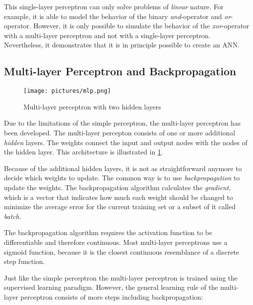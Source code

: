 This single-layer perceptron can only solve problems of \textit{linear} nature. For example, it is able to model the behavior of the binary \textit{and}-operator and \textit{or}-operator. However, it is only possible to simulate the behavior of the \textit{xor}-operator with a multi-layer perceptron and not with a single-layer perceptron. Nevertheless, it demonstrates that it is in principle possible to create an \ac{ANN}.
\cite{haykin2009neural}

\subsection*{Multi-layer Perceptron and Backpropagation}
\begin{figure}[ht]
    \centering 
    \texttt{[image: pictures/mlp.png]}
    \caption{Multi-layer perceptron with two hidden layers \cite{nielsen2015neural}}
    \label{pic:mlp}    %
\end{figure}
Due to the limitations of the simple perceptron, the multi-layer perceptron has been developed. The multi-layer percepton consists of one or more additional \textit{hidden} layers. The weights connect the input and output nodes with the nodes of the hidden layer. This architecture is illustrated in \cref{pic:mlp}.

Because of the additional hidden layers, it is not as straightforward anymore to decide which weights to update. The common way is to use \textit{backpropagation} to update the weights. The backpropagation algorithm calculates the \textit{gradient}, which is a vector that indicates how much each weight should be changed to minimize the average error for the current training set or a subset of it called \textit{batch}.
\cite{nielsen2015neural,hochreiter2001gradient}

The backpropagation algorithm requires the activation function to be differentiable and therefore continuous. Most multi-layer perceptrons use a sigmoid function, because it is the closest continuous resemblance of a discrete step function.
\cite{haykin2009neural,nielsen2015neural}

Just like the simple perceptron the multi-layer perceptron is trained using the supervised learning paradigm. However, the general learning rule of the multi-layer perceptron consists of more steps including backpropagation:

